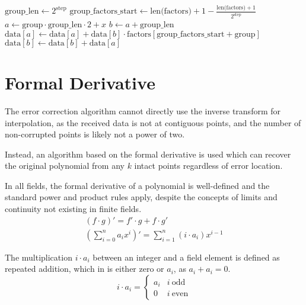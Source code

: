 \begin{algorithm}
    \begin{algorithmic}
                \State $\text{group\_len} \gets 2^\text{step}$
                \State $\text{group\_factors\_start} \gets \text{len(factors)} + 1 - \frac{\text{len(factors)} + 1}{2^{\text{step}}}$
                        \State $a \gets \text{group} \cdot \text{group\_len} \cdot 2 + x$
                        \State $b \gets a + \text{group\_len}$
                        \State $\text{data}[a] \gets \text{data}[a] + \text{data}[b] \cdot \text{factors}[\text{group\_factors\_start} + \text{group}]$
                        \State $\text{data}[b] \gets \text{data}[b] + \text{data}[a]$
                    \EndFor
                \EndFor
            \EndFor
        \EndFunction
    \end{algorithmic}
\end{algorithm}

\section{Formal Derivative}

The error correction algorithm cannot directly use the inverse transform for interpolation, as the received data is not at contiguous points, and the number of non-corrupted points is likely not a power of two.

Instead, an algorithm based on the formal derivative is used which can recover the original polynomial from any $k$ intact points regardless of error location.

In all fields, the formal derivative of a polynomial is well-defined and the standard power and product rules apply, despite the concepts of limits and continuity not existing in finite fields.
\begin{gather*}
(f \cdot g)' = f' \cdot g + f \cdot g'\\
(\sum_{i = 0}^{n} a_i x^i)' = \sum_{i = 1}^{n} (i \cdot a_i) x^{i - 1}
\end{gather*}

The multiplication $i \cdot a_i$ between an integer and a field element is defined as repeated addition, which in  is either zero or $a_i$, as $a_i + a_i = 0$.
\[
i \cdot a_i =
    \begin{cases}
        a_i & i\ \text{odd} \\
        0 & i\ \text{even}
    \end{cases}
\]

